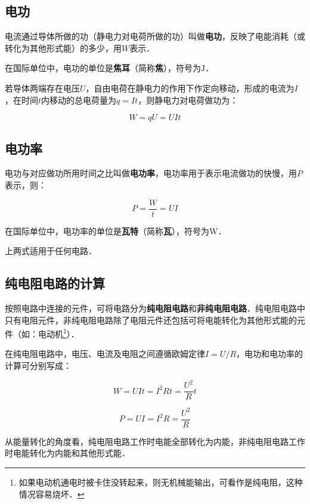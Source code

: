 
\subsection{电功}

电流通过导体所做的功（静电力对电荷所做的功）叫做\textbf{电功}，反映了电能消耗（或转化为其他形式能）的多少，用$W$表示．

在国际单位中，电功的单位是\textbf{焦耳}（简称\textbf{焦}），符号为$\mathrm{J}$．

若导体两端存在电压$U$，自由电荷在静电力的作用下作定向移动，形成的电流为$I$，在时间$t$内移动的总电荷量为$q=It$，则静电力对电荷做功为：

\begin{equation}
W=qU=UIt
\end{equation}

\subsection{电功率}

电功与对应做功所用时间之比叫做\textbf{电功率}，电功率用于表示电流做功的快慢，用$P$表示，则：

\begin{equation}
P=\frac{W}{t}=UI
\end{equation}

在国际单位中，电功率的单位是\textbf{瓦特}（简称\textbf{瓦}），符号为$\mathrm{W}$．

上两式适用于任何电路．

\subsection{纯电阻电路的计算}

按照电路中连接的元件，可将电路分为\textbf{纯电阻电路}和\textbf{非纯电阻电路}．纯电阻电路中只有电阻元件，非纯电阻电路除了电阻元件还包括可将电能转化为其他形式能的元件（如：电动机\footnote{如果电动机通电时被卡住没转起来，则无机械能输出，可看作是纯电阻，这种情况容易烧坏．}）．

在纯电阻电路中，电压、电流及电阻之间遵循欧姆定律$I=U/R$，电功和电功率的计算可分别写成：

\begin{equation}
W=UIt=I^2 Rt=\frac{U^2}{R}t
\end{equation}

\begin{equation}
P=UI=I^2 R=\frac{U^2}{R}
\end{equation}

从能量转化的角度看，纯电阻电路工作时电能全部转化为内能，非纯电阻电路工作时电能转化为内能和其他形式能．
